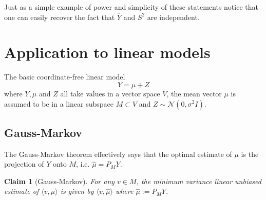 \documentclass[11pt]{report}
\newtheorem{claim}{Claim}
\begin{document}
Just as a simple example of power and simplicity of these statements notice that one can easily recover the fact that $\overline Y$ and $S^2$ are independent.



\section{Application to linear models}

The basic coordinate-free linear model 
\[
Y = \mu + Z
\]
where $Y, \mu$ and $Z$ all take values in a vector space $V$, the mean vector $\mu$ is assumed to be in a linear subspace $M\subset V$ and $Z\sim \mathcal N(0,\sigma^2I)$. 

\subsection{Gauss-Markov}
The Gauss-Markov theorem effectively says that the optimal estimate of $\mu$ is the projection of $Y$ onto $M$, i.e. $\hat\mu = P_M Y$. 
\begin{claim}[Gauss-Markov]
For any $v\in M$, the minimum variance linear unbiased estimate of $\langle v,\mu\rangle$ is given by $\langle v,\hat\mu\rangle$ where $\hat\mu := P_M Y$. 
\end{claim}
\end{document}
